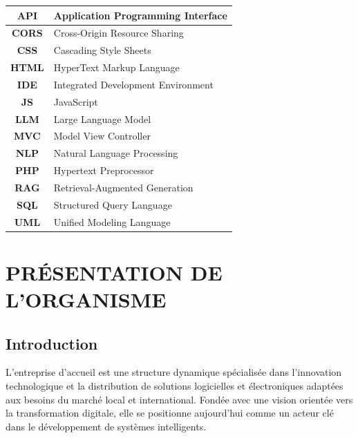 \documentclass[12pt, a4paper, oneside]{report}
\begin{document}
\begin{table}[H]
\centering
\renewcommand{\arraystretch}{1.4}
\begin{tabular}{|c|L{12cm}|}
\hline
\textbf{API} & Application Programming Interface \\ \hline
\textbf{CORS} & Cross-Origin Resource Sharing \\ \hline
\textbf{CSS} & Cascading Style Sheets \\ \hline
\textbf{HTML} & HyperText Markup Language \\ \hline
\textbf{IDE} & Integrated Development Environment \\ \hline
\textbf{JS} & JavaScript \\ \hline
\textbf{LLM} & Large Language Model \\ \hline
\textbf{MVC} & Model View Controller \\ \hline
\textbf{NLP} & Natural Language Processing \\ \hline
\textbf{PHP} & Hypertext Preprocessor \\ \hline
\textbf{RAG} & Retrieval-Augmented Generation \\ \hline
\textbf{SQL} & Structured Query Language \\ \hline
\textbf{UML} & Unified Modeling Language \\ \hline
\end{tabular}
\end{table}

\newpage

\listoffigures
\newpage

\listoftables
\newpage

\setcounter{page}{1}

\chapter{PRÉSENTATION DE L'ORGANISME}

\section{Introduction}
L'entreprise d'accueil est une structure dynamique spécialisée dans l'innovation technologique et la distribution de solutions logicielles et électroniques adaptées aux besoins du marché local et international. Fondée avec une vision orientée vers la transformation digitale, elle se positionne aujourd'hui comme un acteur clé dans le développement de systèmes intelligents.
\end{document}
